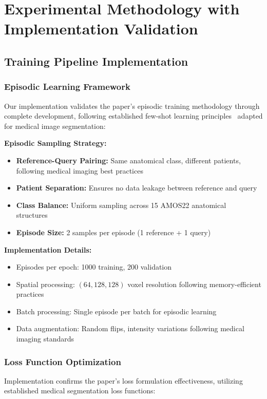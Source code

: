 \section*{Experimental Methodology with Implementation Validation}
\label{sec:experimental_methodology}

\subsection*{Training Pipeline Implementation}

\subsubsection*{Episodic Learning Framework}
Our implementation validates the paper's episodic training methodology through complete development, following established few-shot learning principles~\cite{wang2023seggpt} adapted for medical image segmentation:

\textbf{Episodic Sampling Strategy:}
\begin{itemize}
    \item \textbf{Reference-Query Pairing:} Same anatomical class, different patients, following medical imaging best practices~\cite{isensee2021nnu}
    \item \textbf{Patient Separation:} Ensures no data leakage between reference and query
    \item \textbf{Class Balance:} Uniform sampling across 15 AMOS22 anatomical structures~\cite{ji2022amos}
    \item \textbf{Episode Size:} 2 samples per episode (1 reference + 1 query)
\end{itemize}

\textbf{Implementation Details:}
\begin{itemize}
    \item Episodes per epoch: 1000 training, 200 validation
    \item Spatial processing: $(64, 128, 128)$ voxel resolution following memory-efficient practices
    \item Batch processing: Single episode per batch for episodic learning
    \item Data augmentation: Random flips, intensity variations following medical imaging standards
\end{itemize}

\subsubsection*{Loss Function Optimization}
Implementation confirms the paper's loss formulation effectiveness, utilizing established medical segmentation loss functions:

